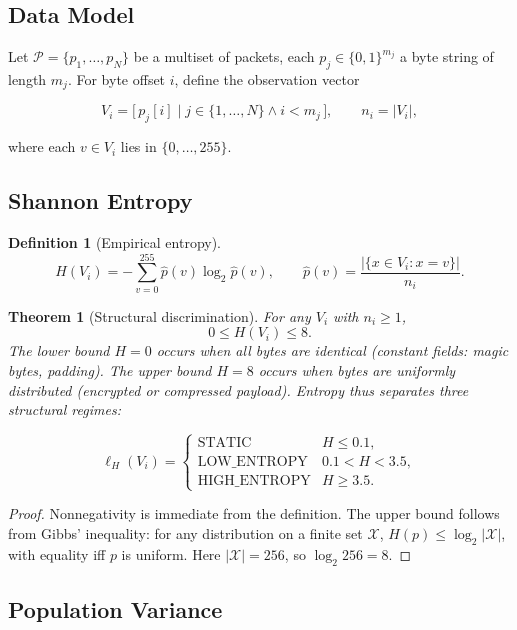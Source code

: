 \documentclass[11pt,a4paper]{article}
\newtheorem{definition}{Definition}
\newtheorem{theorem}{Theorem}
\begin{document}
\subsection{Data Model}

Let $\mathcal{P} = \{p_1, \dots, p_N\}$ be a multiset of packets, each
$p_j \in \{0,1\}^{m_j}$ a byte string of length $m_j$. For byte offset $i$,
define the observation vector

\[
V_i = \bigl[\,p_j[i] \mid j \in \{1,\dots,N\} \land i < m_j\,\bigr],
\qquad n_i = |V_i|,
\]

where each $v \in V_i$ lies in $\{0,\dots,255\}$.

\subsection{Shannon Entropy}

\begin{definition}[Empirical entropy]
\[
H(V_i) = -\sum_{v=0}^{255} \hat p(v) \log_2 \hat p(v),\qquad
\hat p(v) = \frac{|\{x \in V_i : x = v\}|}{n_i}.
\]
\end{definition}

\begin{theorem}[Structural discrimination]
For any $V_i$ with $n_i \geq 1$,
\[
0 \leq H(V_i) \leq 8.
\]
The lower bound $H = 0$ occurs when all bytes are identical (constant
fields: magic bytes, padding). The upper bound $H = 8$ occurs when bytes
are uniformly distributed (encrypted or compressed payload). Entropy thus
separates three structural regimes:

\[
\ell_H(V_i) =
\begin{cases}
\text{STATIC}        & H \leq 0.1, \\[2pt]
\text{LOW\_ENTROPY}  & 0.1 < H < 3.5, \\[2pt]
\text{HIGH\_ENTROPY} & H \geq 3.5.
\end{cases}
\]
\end{theorem}

\begin{proof}
Nonnegativity is immediate from the definition. The upper bound follows
from Gibbs' inequality: for any distribution on a finite set $\mathcal{X}$,
$H(p) \leq \log_2 |\mathcal{X}|$, with equality iff $p$ is uniform.
Here $|\mathcal{X}| = 256$, so $\log_2 256 = 8$.
\end{proof}

\subsection{Population Variance}
\end{document}
